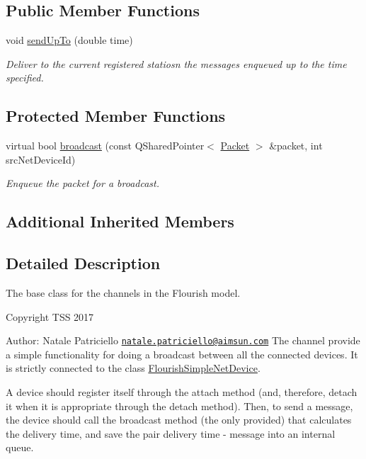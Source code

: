 \subsection*{Public Member Functions}
\begin{DoxyCompactItemize}
\item 
void \hyperlink{classFlourishSimpleChannel_af9becdf9708f16e182652cd50954f222}{send\+Up\+To} (double time)
\begin{DoxyCompactList}\small\item\em Deliver to the current registered statiosn the messages enqueued up to the time specified. \end{DoxyCompactList}\end{DoxyCompactItemize}
\subsection*{Protected Member Functions}
\begin{DoxyCompactItemize}
\item 
virtual bool \hyperlink{classFlourishSimpleChannel_a4edba03aee0227355da4944eebee382d}{broadcast} (const Q\+Shared\+Pointer$<$ \hyperlink{classV2XMessage}{Packet} $>$ \&packet, int src\+Net\+Device\+Id)
\begin{DoxyCompactList}\small\item\em Enqueue the packet for a broadcast. \end{DoxyCompactList}\end{DoxyCompactItemize}
\subsection*{Additional Inherited Members}


\subsection{Detailed Description}
The base class for the channels in the Flourish model. 

Copyright T\+SS 2017

Author\+: Natale Patriciello \href{mailto:natale.patriciello@aimsun.com}{\tt natale.\+patriciello@aimsun.\+com} The channel provide a simple functionality for doing a broadcast between all the connected devices. It is strictly connected to the class \hyperlink{classFlourishSimpleNetDevice}{Flourish\+Simple\+Net\+Device}.

A device should register itself through the attach method (and, therefore, detach it when it is appropriate through the detach method). Then, to send a message, the device should call the broadcast method (the only provided) that calculates the delivery time, and save the pair delivery time -\/ message into an internal queue.

